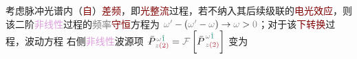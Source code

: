 考虑\textcolor{NavyBlue}{脉冲光}谱内（\textcolor{Maroon}{自}）\textcolor{Maroon}{差频}，即\textcolor{Maroon}{光整流}过程，若不纳入其后续级联的\textcolor{Maroon}{电光效应}，则该二阶\textcolor{Plum}{非线性}过程的\textcolor{gray}{频率}\textcolor{Maroon}{守恒}方程为 $ \textcolor{gray}{\omega'} - \left( \textcolor{gray}{\omega'}-\textcolor{gray}{\omega} \right) \to \textcolor{gray}{\omega} > \textcolor{gray}{0}$；对于该\textcolor{Maroon}{下转换}过程，波动方程  右侧\textcolor{Plum}{非线性}\textcolor{NavyBlue}{波源}项 $\xint{\mathcolor{gray}{-}}{25}{\bar{P}}^{\;\! \mathcolor{gray}{\omega} \textcolor{PineGreen}{\hat{1}} }_{\;\! \mathcolor{gray}{z}  \textcolor{Maroon}{(2)}} = \mathcolor{gray}{\mathcal F} \left[ {\bar{P}}^{\;\! \mathcolor{gray}{\omega} \textcolor{PineGreen}{\hat{1}} }_{\;\! \mathcolor{gray}{z}  \textcolor{Maroon}{(2)}} \right]$ 变为
